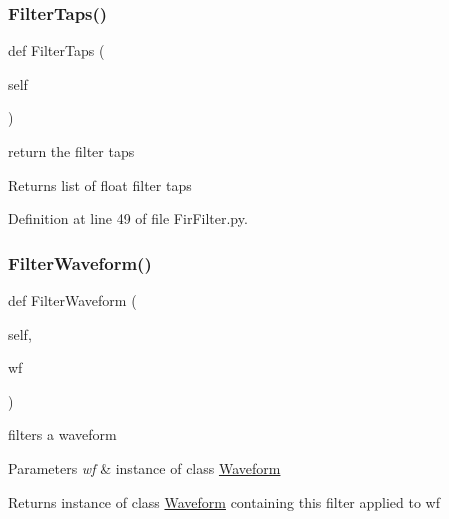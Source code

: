 \subsubsection{\texorpdfstring{Filter\+Taps()}{FilterTaps()}}
{\footnotesize\ttfamily def Filter\+Taps (\begin{DoxyParamCaption}\item[{}]{self }\end{DoxyParamCaption})}



return the filter taps 

\begin{DoxyReturn}{Returns}
list of float filter taps 
\end{DoxyReturn}


Definition at line 49 of file Fir\+Filter.\+py.

\mbox{\label{classSignalIntegrity_1_1TimeDomain_1_1Filters_1_1FirFilter_1_1FirFilter_a84e73c18250ca4a61482f94ad61e735b}} 
\subsubsection{\texorpdfstring{Filter\+Waveform()}{FilterWaveform()}}
{\footnotesize\ttfamily def Filter\+Waveform (\begin{DoxyParamCaption}\item[{}]{self,  }\item[{}]{wf }\end{DoxyParamCaption})}



filters a waveform 


\begin{DoxyParams}{Parameters}
{\em wf} & instance of class \hyperlink{namespaceSignalIntegrity_1_1TimeDomain_1_1Waveform}{Waveform} \\
\hline
\end{DoxyParams}
\begin{DoxyReturn}{Returns}
instance of class \hyperlink{namespaceSignalIntegrity_1_1TimeDomain_1_1Waveform}{Waveform} containing this filter applied to wf 
\end{DoxyReturn}


